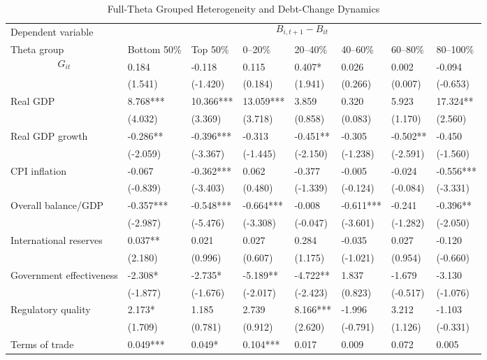 \begin{table}[H]\centering
\begin{threeparttable}
\caption{Full-Theta Grouped Heterogeneity and Debt-Change Dynamics}
\label{tab:theta_group_heterogeneity_debt}
\scriptsize
\begin{tabularx}{\textwidth}{lYYYYYYY}
\toprule
Dependent variable &  \\
\cmidrule(lr){2-8}
Theta group & Bottom 50\% & Top 50\% & 0--20\% & 20--40\% & 40--60\% & 60--80\% & 80--100\% \\
\midrule
$$G_{it}$$ & 0.184 & -0.118 & 0.115 & 0.407* & 0.026 & 0.002 & -0.094 \\
  & (1.541) & (-1.420) & (0.184) & (1.941) & (0.266) & (0.007) & (-0.653) \\
Real GDP & 8.768*** & 10.366*** & 13.059*** & 3.859 & 0.320 & 5.923 & 17.324** \\
  & (4.032) & (3.369) & (3.718) & (0.858) & (0.083) & (1.170) & (2.560) \\
Real GDP growth & -0.286** & -0.396*** & -0.313 & -0.451** & -0.305 & -0.502** & -0.450 \\
  & (-2.059) & (-3.367) & (-1.445) & (-2.150) & (-1.238) & (-2.591) & (-1.560) \\
CPI inflation & -0.067 & -0.362*** & 0.062 & -0.377 & -0.005 & -0.024 & -0.556*** \\
  & (-0.839) & (-3.403) & (0.480) & (-1.339) & (-0.124) & (-0.084) & (-3.331) \\
Overall balance/GDP & -0.357*** & -0.548*** & -0.664*** & -0.008 & -0.611*** & -0.241 & -0.396** \\
  & (-2.987) & (-5.476) & (-3.308) & (-0.047) & (-3.601) & (-1.282) & (-2.050) \\
International reserves & 0.037** & 0.021 & 0.027 & 0.284 & -0.035 & 0.027 & -0.120 \\
  & (2.180) & (0.996) & (0.607) & (1.175) & (-1.021) & (0.954) & (-0.660) \\
Government effectiveness & -2.308* & -2.735* & -5.189** & -4.722** & 1.837 & -1.679 & -3.130 \\
  & (-1.877) & (-1.676) & (-2.017) & (-2.423) & (0.823) & (-0.517) & (-1.076) \\
Regulatory quality & 2.173* & 1.185 & 2.739 & 8.166*** & -1.996 & 3.212 & -1.103 \\
  & (1.709) & (0.781) & (0.912) & (2.620) & (-0.791) & (1.126) & (-0.331) \\
Terms of trade & 0.049*** & 0.049* & 0.104*** & 0.017 & 0.009 & 0.072 & 0.005 \\

\end{tabularx}
\end{threeparttable}
\end{table}
